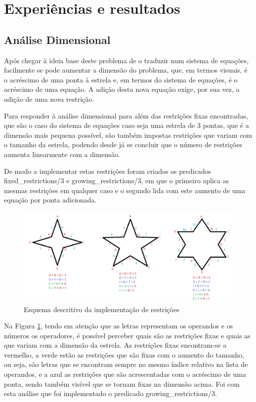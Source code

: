\section{Experiências e resultados}

\subsection{Análise Dimensional}
Após chegar à ideia base deste problema de o traduzir num sistema de equações, facilmente se pode aumentar a dimensão do problema, que, em termos visuais, é o acréscimo de uma ponta à estrela e, em termos do sistema de equações, é o acréscimo de uma equação. A adição desta nova equação exige, por sua vez, a adição de uma nova restrição.

Para responder à análise dimensional para além das restrições fixas encontradas, que são o caso do sistema de equações caso seja uma estrela de 3 pontas, que é a dimensão mais pequena possível, são também impostas restrições que variam com o tamanho da estrela, podendo desde já se concluir que o número de restrições aumenta linearmente com a dimensão.

De modo a implementar estas restrições foram criados os predicados fixed\_restrictions/3 e growing\_restrictions/3, em que o primeiro aplica as mesmas restrições em qualquer caso e o segundo lida com este aumento de uma equação por ponta adicionada.

\begin{figure}[!htb]
\includegraphics[width=\textwidth]{images/star_analysis.png}
\caption{Esquema descritivo da implementação de restrições} \label{fig:descricao_restricoes}
\end{figure}

Na Figura \ref{fig:descricao_restricoes}, tendo em atenção que as letras representam os operandos e os números os operadores, é possível perceber quais são as restrições fixas e quais as que variam com a dimensão da estrela. As restrições fixas encontram-se a vermelho, a verde estão as restrições que são fixas com o aumento do tamanho, ou seja, são letras que se encontram sempre no mesmo índice relativo na lista de operandos, e a azul as restrições que são acrescentadas com o acréscimo de uma ponta, sendo também visível que se tornam fixas na dimensão acima. Foi com esta análise que foi implementado o predicado growing\_restrictions/3.

